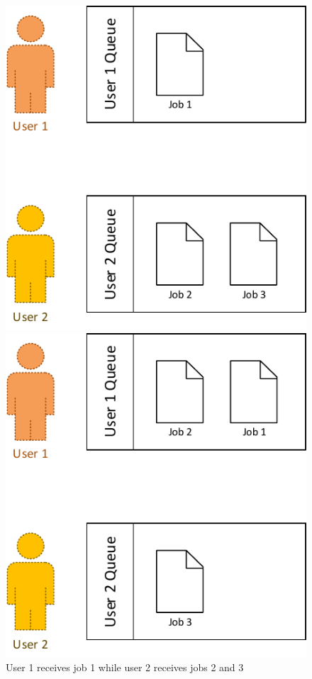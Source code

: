 \begin{figure}[!ht]
	\centering
	\begin{minipage}[b]{0.45\textwidth}
		\includegraphics[width=\textwidth]{img/user_job_assignment_order}
		\caption{User 1 receives job 1 while user 2 receives jobs 2 and 3}
		\label{fig:user_job_assignment_order}
	\end{minipage}
	\hfill
	\begin{minipage}[b]{0.45\textwidth}
		\includegraphics[width=\textwidth]{img/user_job_assignment_order2}

\end{minipage}
\end{figure}
